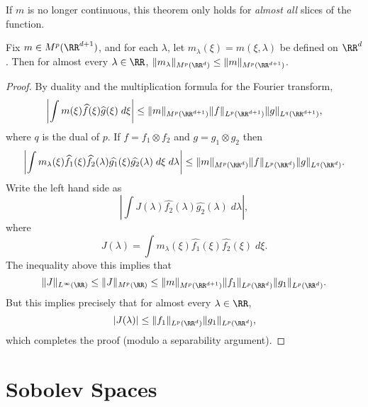 If $m$ is no longer continuous, this theorem only holds for \emph{almost all} slices of the function.

\begin{theorem}
    Fix $m \in M^p(\RR^{d+1})$, and for each $\lambda$, let $m_\lambda(\xi) = m(\xi,\lambda)$ be defined on $\RR^d$. Then for almost every $\lambda \in \RR$, $\| m_\lambda \|_{M^p(\RR^d)} \leq \| m \|_{M^p(\RR^{d+1})}$.
\end{theorem}
\begin{proof}
    By duality and the multiplication formula for the Fourier transform,
    \[ \left| \int m(\xi) \widehat{f}(\xi) \widehat{g}(\xi)\; d\xi \right| \leq \| m \|_{M^p(\RR^{d+1})} \| f \|_{L^p(\RR^{d+1})} \| g \|_{L^q(\RR^{d+1})}, \]
    where $q$ is the dual of $p$. If $f = f_1 \otimes f_2$ and $g = g_1 \otimes g_2$ then
    \[ \left| \int m_\lambda(\xi) \widehat{f_1}(\xi) \widehat{f_2}(\lambda) \widehat{g_1}(\xi) \widehat{g_2}(\lambda)\; d\xi\; d\lambda \right| \leq \| m \|_{M^p(\RR^d)} \| f \|_{L^p(\RR^d)} \| g \|_{L^q(\RR^d)}. \]
    Write the left hand side as
    \[ \left| \int J(\lambda) \widehat{f_2}(\lambda) \widehat{g_2}(\lambda)\; d\lambda \right|, \]
    where
    \[ J(\lambda) = \int m_\lambda(\xi) \widehat{f_1}(\xi) \widehat{f_2}(\xi)\; d\xi. \]
    The inequality above this implies that
    \[ \| J \|_{L^\infty(\RR)} \leq \| J \|_{M^p(\RR)} \leq \| m \|_{M^p(\RR^{d+1})} \| f_1 \|_{L^p(\RR^d)} \| g_1 \|_{L^p(\RR^d)}. \]
    But this implies precisely that for almost every $\lambda \in \RR$,
    \[ |J(\lambda)| \leq \| f_1 \|_{L^p(\RR^d)} \| g_1 \|_{L^p(\RR^d)}, \]
    which completes the proof (modulo a separability argument).
\end{proof}












\chapter{Sobolev Spaces}


